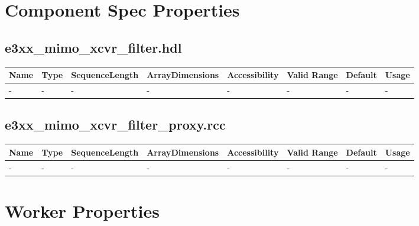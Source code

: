 \documentclass{article}
\def\comp{e3xx\_mimo\_xcvr\_filter}
\def\proxy{e3xx\_mimo\_xcvr\_filter\_proxy}
\def\comp{e3xx\_mimo\_xcvr\_filter}
\begin{document}
\begin{landscape}
\section*{Component Spec Properties}
\subsection*{\comp.hdl}
	\begin{scriptsize}
		\begin{tabular}{|p{3.75cm}|p{1.25cm}|p{2cm}|p{2.75cm}|p{1.5cm}|p{1.5cm}|p{1cm}|p{6.23cm}|}
			\hline
            \rowcolor{blue}
            Name               & Type & SequenceLength & ArrayDimensions & Accessibility      & Valid Range & Default & Usage                                                                          \\
            \hline
            - & - & - & - & - & - & - & - \\
            \hline
        \end{tabular}
    \end{scriptsize}
\subsection*{\proxy.rcc}
	\begin{scriptsize}
		\begin{tabular}{|p{3.75cm}|p{1.25cm}|p{2cm}|p{2.75cm}|p{1.5cm}|p{1.5cm}|p{1cm}|p{6.23cm}|}
			\hline
            \rowcolor{blue}
            Name               & Type & SequenceLength & ArrayDimensions & Accessibility      & Valid Range & Default & Usage                                                                          \\
            \hline
            - & - & - & - & - & - & - & - \\
            \hline
        \end{tabular}
    \end{scriptsize}

\section*{Worker Properties}

\end{landscape}
\end{document}

